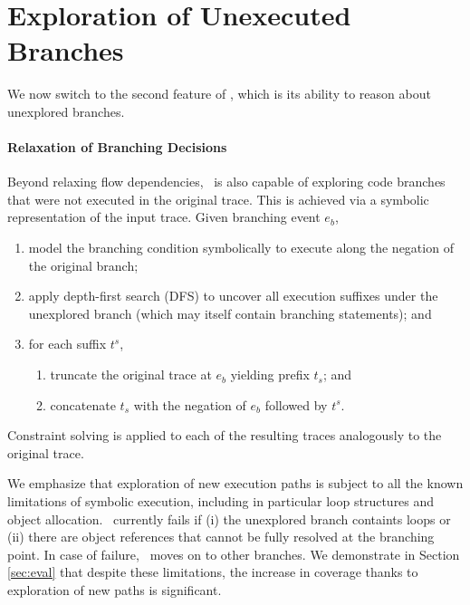 \section{Exploration of Unexecuted Branches}

We now switch to the second feature of \tool, which is its ability to reason about unexplored branches.

\paragraph{Relaxation of Branching Decisions}

Beyond relaxing flow dependencies, \tool\ is also capable of exploring code branches that were not executed in the original trace. This is achieved via a symbolic representation of the input trace. Given branching event $e_b$,
\begin{enumerate}
	\item model the branching condition symbolically to execute along the negation of the original branch;
	\item apply depth-first search (DFS) to uncover all execution suffixes under the unexplored branch (which may itself contain branching statements); and
	\item for each suffix $t^s$,
	\begin{enumerate}
		\item truncate the original trace at $e_b$ yielding prefix $t_s$; and
		\item concatenate $t_s$ with the negation of $e_b$ followed by $t^s$.
	\end{enumerate}
\end{enumerate}
Constraint solving is applied to each of the resulting traces analogously to the original trace.

We emphasize that exploration of new execution paths is subject to all the known limitations of symbolic execution, including in particular loop structures and object allocation. \tool\ currently fails if (i) the unexplored branch containts loops or (ii) there are object references that cannot be fully resolved at the branching point. In case of failure, \tool\ moves on to other branches. We demonstrate in Section \ref{sec:eval} that despite these limitations, the increase in coverage thanks to exploration of new paths is significant.